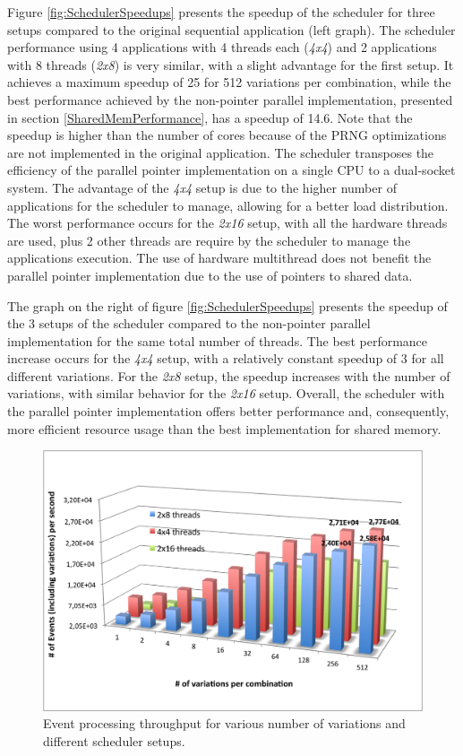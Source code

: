 Figure \ref{fig:SchedulerSpeedups} presents the speedup of the scheduler for three setups compared to the original sequential application (left graph). The scheduler performance using 4 applications with 4 threads each (\textit{4x4}) and 2 applications with 8 threads (\textit{2x8}) is very similar, with a slight advantage for the first setup. It achieves a maximum speedup of 25 for 512 variations per combination, while the best performance achieved by the non-pointer parallel implementation, presented in section \ref{SharedMemPerformance}, has a speedup of 14.6. Note that the speedup is higher than the number of cores because of the PRNG optimizations are not implemented in the original application. The scheduler transposes the efficiency of the parallel pointer implementation on a single CPU to a dual-socket system. The advantage of the \textit{4x4} setup is due to the higher number of applications for the scheduler to manage, allowing for a better load distribution. The worst performance occurs for the \textit{2x16} setup, with all the hardware threads are used, plus 2 other threads are require by the scheduler to manage the applications execution. The use of hardware multithread does not benefit the parallel pointer implementation due to the use of pointers to shared data.

The graph on the right of figure \ref{fig:SchedulerSpeedups} presents the speedup of the 3 setups of the scheduler compared to the non-pointer parallel implementation for the same total number of threads. The best performance increase occurs for the \textit{4x4} setup, with a relatively constant speedup of 3 for all different variations. For the \textit{2x8} setup, the speedup increases with the number of variations, with similar behavior for the \textit{2x16} setup. Overall, the scheduler with the parallel pointer implementation offers better performance and, consequently, more efficient resource usage than the best implementation for shared memory.

\begin{figure}[!htp]
	\begin{center}
		\includegraphics[scale=0.7]{../../common/graphs/throughput_scheduler.png}
		\caption{Event processing throughput for various number of variations and different scheduler setups.}
		\label{fig:SchedulerThroughput}
	\end{center}
\end{figure}

